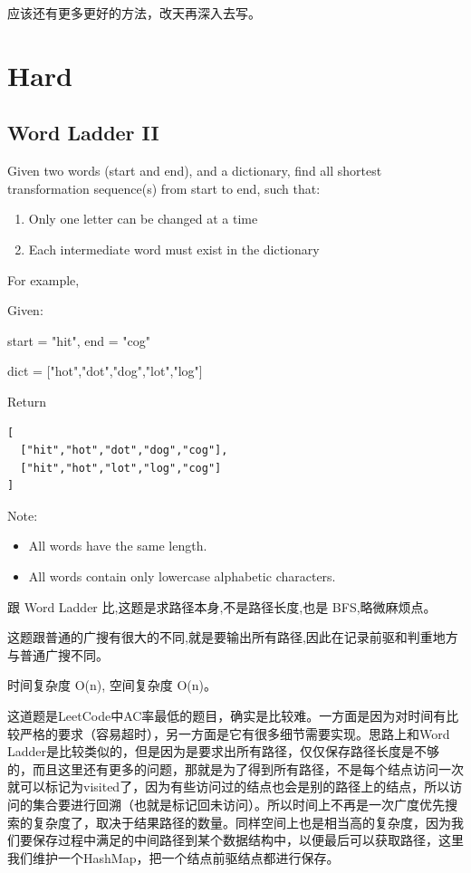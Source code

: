 \documentclass[12pt]{book}
\begin{document}
应该还有更多更好的方法，改天再深入去写。

\section{Hard}
\label{sec-10-2}
\subsection{Word Ladder II}
\label{sec-10-2-1}
Given two words (start and end), and a dictionary, find all shortest transformation sequence(s) from start to end, such that:
\begin{enumerate}
\item Only one letter can be changed at a time
\item Each intermediate word must exist in the dictionary
\end{enumerate}
For example,

Given:

start = "hit", end = "cog"

dict = ["hot","dot","dog","lot","log"]

Return
\lstset{language=java,label= ,caption= ,numbers=none}
\begin{lstlisting}
[
  ["hit","hot","dot","dog","cog"],
  ["hit","hot","lot","log","cog"]
]
\end{lstlisting}

Note:
\begin{itemize}
\item All words have the same length.
\item All words contain only lowercase alphabetic characters.
\end{itemize}

跟 Word Ladder 比,这题是求路径本身,不是路径长度,也是 BFS,略微麻烦点。

这题跟普通的广搜有很大的不同,就是要输出所有路径,因此在记录前驱和判重地方与普通广搜不同。

时间复杂度 O(n), 空间复杂度 O(n)。

这道题是LeetCode中AC率最低的题目，确实是比较难。一方面是因为对时间有比较严格的要求（容易超时），另一方面是它有很多细节需要实现。思路上和Word Ladder是比较类似的，但是因为是要求出所有路径，仅仅保存路径长度是不够的，而且这里还有更多的问题，那就是为了得到所有路径，不是每个结点访问一次就可以标记为visited了，因为有些访问过的结点也会是别的路径上的结点，所以访问的集合要进行回溯（也就是标记回未访问）。所以时间上不再是一次广度优先搜索的复杂度了，取决于结果路径的数量。同样空间上也是相当高的复杂度，因为我们要保存过程中满足的中间路径到某个数据结构中，以便最后可以获取路径，这里我们维护一个HashMap，把一个结点前驱结点都进行保存。
\end{document}

